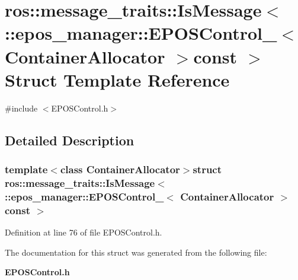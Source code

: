 \section{ros\-:\-:message\-\_\-traits\-:\-:\-Is\-Message$<$ \-:\-:epos\-\_\-manager\-:\-:\-E\-P\-O\-S\-Control\-\_\-$<$ \-Container\-Allocator $>$const $>$ \-Struct \-Template \-Reference}
\label{structros_1_1message__traits_1_1IsMessage_3_01_1_1epos__manager_1_1EPOSControl___3_01ContainerAllocator_01_4const_01_01_4}


{\ttfamily \#include $<$\-E\-P\-O\-S\-Control.\-h$>$}



\subsection{\-Detailed \-Description}
\subsubsection*{template$<$class Container\-Allocator$>$struct ros\-::message\-\_\-traits\-::\-Is\-Message$<$ \-::epos\-\_\-manager\-::\-E\-P\-O\-S\-Control\-\_\-$<$ Container\-Allocator $>$const  $>$}



\-Definition at line 76 of file \-E\-P\-O\-S\-Control.\-h.



\-The documentation for this struct was generated from the following file\-:\begin{DoxyCompactItemize}
\item 
{\bf \-E\-P\-O\-S\-Control.\-h}\end{DoxyCompactItemize}

